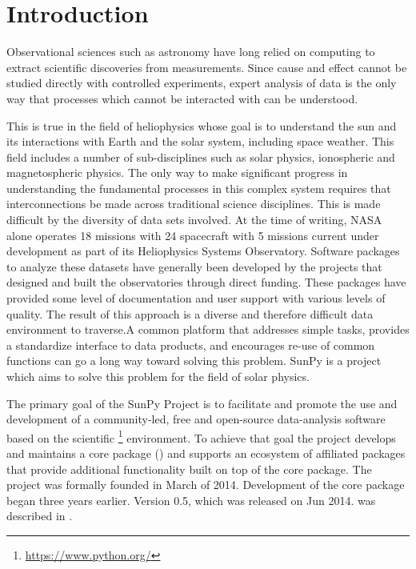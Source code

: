 \section{Introduction}
\label{sec:intro}

Observational sciences such as astronomy have long relied on computing  to extract scientific discoveries from measurements. Since
cause and effect cannot be studied directly with controlled experiments, expert analysis
of data is the only way that processes which cannot be interacted with can be
understood. 

This is true in the field of heliophysics whose goal is to understand the sun and its interactions with Earth and the solar system, including space weather. This field includes a number of sub-disciplines such as solar physics, ionospheric and magnetospheric physics. The only way to make significant progress in understanding the fundamental processes in this complex system requires that interconnections be made across traditional science disciplines. This is made difficult by the diversity of data sets involved. At the time of writing, NASA alone operates 18 missions with 24 spacecraft with 5 missions current under development as part of its Heliophysics Systems Observatory.  Software packages to analyze these datasets have generally been developed by the projects that designed and built the observatories through direct funding. These packages have provided some level of documentation and user support with various levels of quality. The result of this approach is a diverse and therefore difficult data environment to traverse.A common platform that addresses simple tasks, provides a standardize interface to data products, and encourages re-use of common functions can go a long way toward solving this problem. SunPy is a project which aims to solve this problem for the field of solar physics. 

The primary goal of the SunPy Project is to facilitate and promote the use and development of a community-led, free and open-source data-analysis software based on the scientific \python\footnote{\url{https://www.python.org/}} environment. To achieve that goal the project develops and maintains a core package (\sunpypkg) and supports an ecosystem of affiliated packages that provide additional functionality built on top of the core package. The project was formally founded in March of 2014. Development of the core package began three years earlier. Version 0.5, which was released on Jun 2014. was described in \citep{Community:2015cy}.

